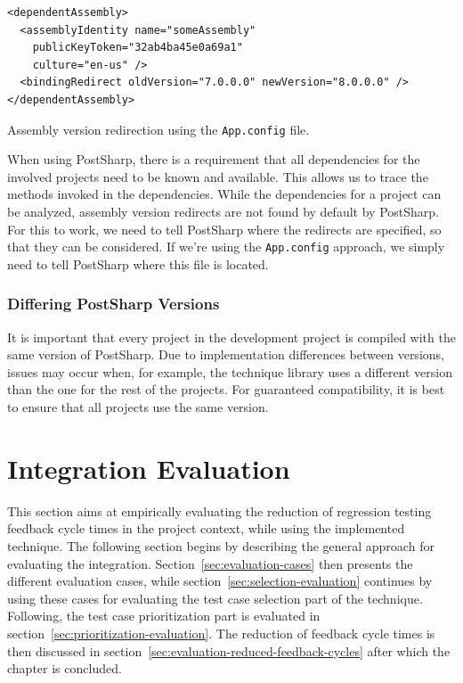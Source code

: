 \documentclass[a4paper,english,12pt]{report}
\newcommand{\textcf}{\texttt}
\begin{document}
\begin{listing}[htbp]
{\footnotesize
\begin{verbatim}
<dependentAssembly>
  <assemblyIdentity name="someAssembly"
    publicKeyToken="32ab4ba45e0a69a1"
    culture="en-us" />
  <bindingRedirect oldVersion="7.0.0.0" newVersion="8.0.0.0" />
</dependentAssembly>
\end{verbatim}
}
\caption{Assembly version redirection using the \textcf{App.config} file.}
\label{lst:assembly-redirect}
\end{listing} 

When using PostSharp, there is a requirement that all dependencies for the involved projects need to be known and available. This allows us to trace the methods invoked in the dependencies. While the dependencies for a project can be analyzed, assembly version redirects are not found by default by PostSharp. For this to work, we need to tell PostSharp where the redirects are specified, so that they can be considered. If we're using the \textcf{App.config} approach, we simply need to tell PostSharp where this file is located.

\subsubsection{Differing PostSharp Versions}
It is important that every project in the development project is compiled with the same version of PostSharp. Due to implementation differences between versions, issues may occur when, for example, the technique library uses a different version than the one for the rest of the projects. For guaranteed compatibility, it is best to ensure that all projects use the same version.

\section{Integration Evaluation}\label{sec:integration-evaluation}
This section aims at empirically evaluating the reduction of regression testing feedback cycle times in the project context, while using the implemented technique. The following section begins by describing the general approach for evaluating the integration. Section~\ref{sec:evaluation-cases} then presents the different evaluation cases, while section~\ref{sec:selection-evaluation} continues by using these cases for evaluating the test case selection part of the technique. Following, the test case prioritization part is evaluated in section~\ref{sec:prioritization-evaluation}. The reduction of feedback cycle times is then discussed in section~\ref{sec:evaluation-reduced-feedback-cycles} after which the chapter is concluded.
\end{document}
